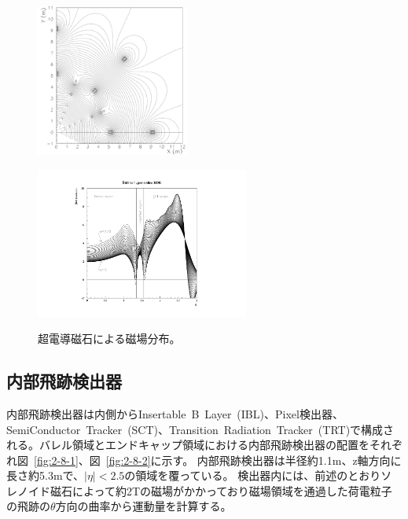 \begin{figure}[h]
  \begin{minipage}[b]{0.45\linewidth}
      \centering
      \includegraphics[clip, width=5cm]{fig/2/FMBmap.pdf}
      \label{fig:2-7-1}
  \end{minipage}
    \begin{minipage}[b]{0.48\linewidth}
      \centering
      \includegraphics[clip, width=7cm]{fig/2/bdl.pdf}
      \label{fig:2-7-2}
  \end{minipage}
  \caption{超電導磁石による磁場分布\cite{article:ATLASMagneticField}。}
\end{figure}

\subsection{内部飛跡検出器}\label{2-2-3}
内部飛跡検出器は内側からInsertable~B~Layer~(IBL)、Pixel検出器、SemiConductor~Tracker~(SCT)、Transition~Radiation~Tracker~(TRT)で構成される。バレル領域とエンドキャップ領域における内部飛跡検出器の配置をそれぞれ図~\ref{fig:2-8-1}、図~\ref{fig:2-8-2}に示す。
内部飛跡検出器は半径約1.1m、z軸方向に長さ約5.3mで、$|\eta|<2.5$の領域を覆っている。
検出器内には、前述のとおりソレノイド磁石によって約2Tの磁場がかかっており磁場領域を通過した荷電粒子の飛跡の$\theta$方向の曲率から運動量を計算する。

